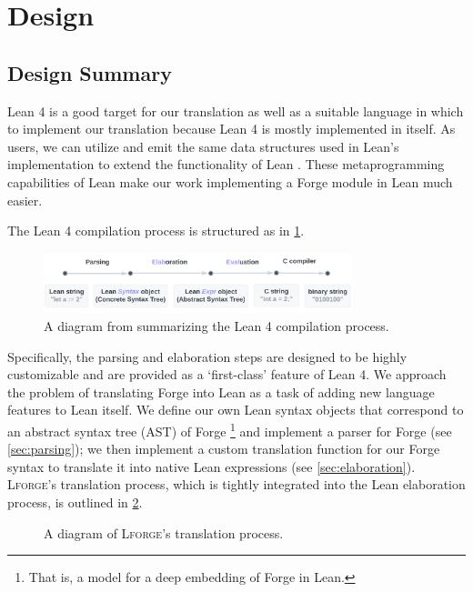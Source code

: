 \section{Design}
\subsection{Design Summary}\label{sec:design-summary}
Lean 4 is a good target for our translation as well as a suitable language in which to implement our translation because Lean 4 is mostly implemented in itself. As users, we can utilize and emit the same data structures used in Lean's implementation to extend the functionality of Lean \cite{moura2021lean}. These metaprogramming capabilities of Lean make our work implementing a Forge module in Lean much easier. 

The Lean 4 compilation process is structured as in \cref{fig:lean-compilation}. 
\begin{figure}[h!]
\centering
\includegraphics[width=0.8\textwidth]{images/lean-compiler.png}
\caption{A diagram from \cite{metaprogramming} summarizing the Lean 4 compilation process.}
\label{fig:lean-compilation}
\end{figure}

Specifically, the parsing and elaboration steps are designed to be highly customizable and are provided as a `first-class' feature of Lean 4. We approach the problem of translating Forge into Lean as a task of adding new language features to Lean itself. We define our own Lean syntax objects that correspond to an abstract syntax tree (AST) of Forge \footnote{That is, a model for a deep embedding of Forge in Lean.} and implement a parser for Forge (see \cref{sec:parsing}); we then implement a custom translation function for our Forge syntax to translate it into native Lean expressions (see \cref{sec:elaboration}). \textsc{Lforge}'s translation process, which is tightly integrated into the Lean elaboration process, is outlined in \cref{fig:lforge-process}. 

\begin{figure}[h!]
\centering

\caption{A diagram of \textsc{Lforge}'s translation process.}
\label{fig:lforge-process}
\end{figure}  

